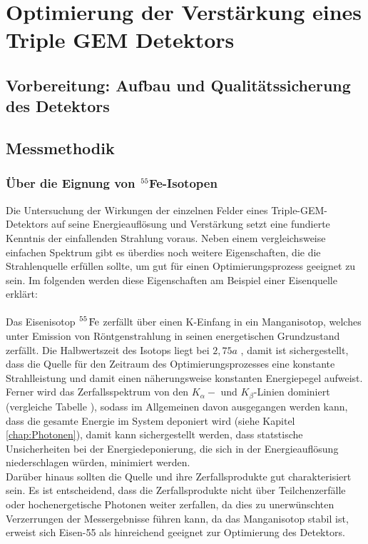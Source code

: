 \chapter{Optimierung der Verstärkung eines Triple GEM Detektors}
	\section{Vorbereitung: Aufbau und Qualitätssicherung des Detektors}
	
	\section{Messmethodik}
		\subsection{Über die Eignung von $\ce{^{55}}$Fe-Isotopen}
			Die Untersuchung der Wirkungen der einzelnen Felder eines Triple-GEM-Detektors auf seine Energieauflösung und Verstärkung setzt eine fundierte Kenntnis der einfallenden Strahlung voraus. Neben einem vergleichsweise einfachen Spektrum gibt es überdies noch weitere Eigenschaften, die die Strahlenquelle erfüllen sollte, um gut für einen Optimierungsprozess geeignet zu sein. Im folgenden werden diese Eigenschaften am Beispiel einer Eisenquelle erklärt:\\
			\\
			Das Eisenisotop $\ce{^55 Fe}$ zerfällt über einen K-Einfang in ein Manganisotop, welches unter Emission von Röntgenstrahlung in seinen energetischen Grundzustand zerfällt. Die Halbwertszeit des Isotops liegt bei $2,75 \si{a}$ \cite{Half_Life_FE55}, damit ist sichergestellt, dass die Quelle für den Zeitraum des Optimierungsprozesses eine konstante Strahlleistung und damit einen näherungsweise konstanten Energiepegel aufweist.\\
			Ferner wird das Zerfallsspektrum von den $K_{\alpha}-$ und $K_{\beta}$-Linien dominiert (vergleiche Tabelle ), sodass im Allgemeinen davon ausgegangen werden kann, dass die gesamte Energie im System deponiert wird (siehe Kapitel \ref{chap:Photonen}), damit kann sichergestellt werden, dass statstische Unsicherheiten bei der Energiedeponierung, die sich in der Energieauflösung niederschlagen würden, minimiert werden.\\
			Darüber hinaus sollten die Quelle und ihre Zerfallsprodukte gut charakterisiert sein. Es ist entscheidend, dass die Zerfallsprodukte nicht über Teilchenzerfälle oder hochenergetische Photonen weiter zerfallen, da dies zu unerwünschten Verzerrungen der Messergebnisse führen kann, da das Manganisotop stabil ist, erweist sich Eisen-55 als hinreichend geeignet zur Optimierung des Detektors.\\
			\\
			 

